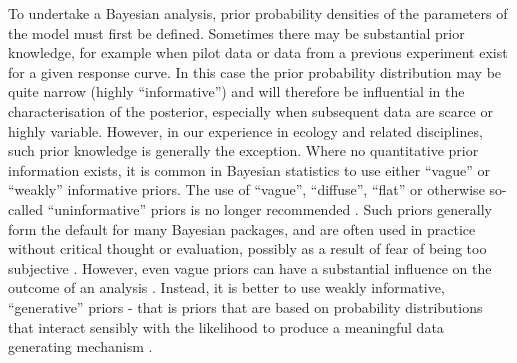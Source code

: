 \documentclass[
  shortnames]{jss}
\begin{document}
To undertake a Bayesian analysis, prior probability densities of the parameters of the model must first be defined. Sometimes there may be substantial prior knowledge, for example when pilot data or data from a previous experiment exist for a given response curve. In this case the prior probability distribution may be quite narrow (highly ``informative'') and will therefore be influential in the characterisation of the posterior, especially when subsequent data are scarce or highly variable. However, in our experience in ecology and related disciplines, such prior knowledge is generally the exception. Where no quantitative prior information exists, it is common in Bayesian statistics to use either ``vague'' or ``weakly'' informative priors. The use of ``vague'', ``diffuse'', ``flat'' or otherwise so-called ``uninformative'' priors is no longer recommended \citep{Banner2020}. Such priors generally form the default for many Bayesian packages, and are often used in practice without critical thought or evaluation, possibly as a result of fear of being too subjective \citep{Banner2020}. However, even vague priors can have a substantial influence on the outcome of an analysis \citep{depaoli2020importance, gelman2017entropy}. Instead, it is better to use weakly informative, ``generative'' priors - that is priors that are based on probability distributions that interact sensibly with the likelihood to produce a meaningful data generating mechanism \citep{gelman2017entropy}.
\end{document}

